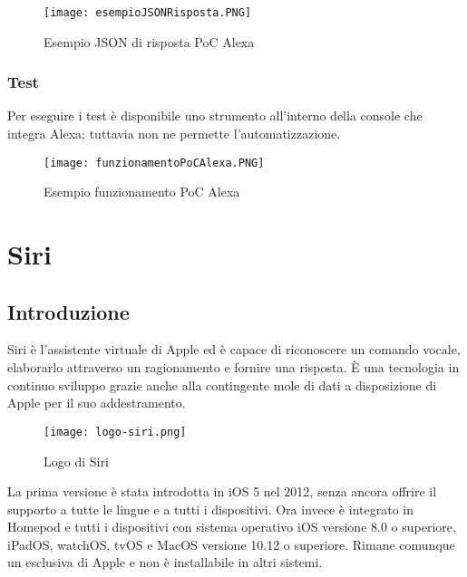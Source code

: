		\begin{figure}[htbp]
			\begin{center}
				\texttt{[image: esempioJSONRisposta.PNG]}
				\caption{Esempio JSON di risposta PoC Alexa}
			\end{center}
		\end{figure}
	
		
		\subsubsection{Test} \mbox{}
		Per eseguire i test è disponibile uno strumento all'interno della console che integra Alexa; tuttavia non ne permette l'automatizzazione.
		
		\begin{figure}[htbp]
			\begin{center}
				\texttt{[image: funzionamentoPoCAlexa.PNG]}
				\caption{Esempio funzionamento PoC Alexa}
			\end{center}
		\end{figure}
\pagebreak
\section{Siri}
	\subsection{Introduzione}
	Siri è l'assistente virtuale di Apple ed è capace di riconoscere un comando vocale, elaborarlo attraverso un ragionamento e fornire una risposta. È una tecnologia in continuo sviluppo grazie anche alla contingente mole di dati a disposizione di Apple per il suo addestramento.
	
	\begin{figure}[htbp]
		\begin{center}
			\texttt{[image: logo-siri.png]}
			\caption{Logo di Siri}
		\end{center}
	\end{figure}
	
	La prima versione è stata introdotta in iOS 5 nel 2012, senza ancora offrire il supporto a tutte le lingue e a tutti i dispositivi. Ora invece è integrato in Homepod e tutti i dispositivi con sistema operativo iOS versione 8.0 o superiore, iPadOS, watchOS, tvOS e MacOS versione 10.12 o superiore. Rimane comunque un esclusiva di Apple e non è installabile in altri sistemi.
